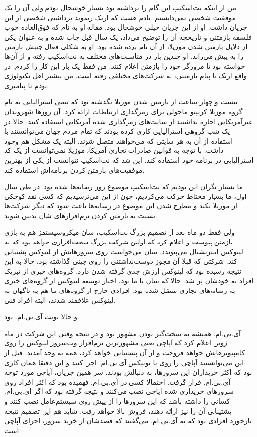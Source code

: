 من از اینکه نت‌اسکیپ این گام را برداشته بود بسیار خوشحال بودم ولی آن را
یک موفقیت شخصی نمی‌دانستم. یادم هست که اریک ریموند برداشتی
شخصی از این جریان داشت. او از این جریان خیلی خوشحال بود. مقاله او به
نام  که فوق‌العاده خوب فلسفه بازمتنی و
تاریخچه آن را توضیح می‌داد، یک سال قبل چاپ شده و به عنوان یکی از دلایل
بازمتن شدن موزیلا، از آن نام برده شده بود. او به شکلی فعال جنبش بازمتن
را به پیش می‌راند. او چندین بار در مناسبت‌های مختلف به نت‌اسکیپ رفته و از
آن‌ها خواسته بود تا مرورگر خود را بازمتن اعلام کنند. من فقط یک بار این
کار را کردم. در واقع اریک با پیام بازمتنی، به شرکت‌های مختلفی رفته
است. من بیشتر اهل تکنولوژی بودم تا پیامبری.

بیست و چهار ساعت از بازمتن شدن موزیلا نگذشته بود که تیمی استرالیایی به
نام گروه موزیلا کریپتو ماجولی برای
رمزگذاری ارتباطات ارائه کرد. آن روزها شهروندان غیرآمریکایی اجازه
نداشتند از سایت‌های رمزگذاری شده آمریکایی استفاده کنند. حالا در یک شب
گروهی استرالیایی کاری کرده بودند که تمام مردم جهان می‌توانستند با
استفاده از آن به هر سایتی که می‌خواهند متصل شوند. البته یک مشکل هم وجود
داشت. با توجه به قوانین صادرات تجاری آمریکا، موزیلا نمی‌توانست از یک کد
استرالیایی در برنامه خود استفاده کند. این شد که نت‌اسکیپ نتوانست از یکی
از بهترین موفقیت‌های بازمتن کردن برنامه‌اش استفاده کند.

ما بسیار نگران این بودیم که نت‌اسکیپ موضوع روز رسانه‌ها شده بود. در طی
سال اول، ما بسیار محتاط حرکت می‌کردیم، چون از این می‌ترسیدیم که کسی نقد
کوچکی از موزیلا بکند و مطرح شدن این موضوع در رسانه‌ها باعث شود که دیگر
شرکت‌ها نسبت به بازمتن کردن نرم‌افزارهای شان بدبین شوند.

ولی فقط دو ماه بعد از تصمیم بزرگ نت‌اسکیپ، سان میکروسیستمز هم به بازی
بازمتن پیوست و اعلام کرد که اولین شرکت بزرگ سخت‌افزاری خواهد بود که به
لینوکس اینترنشنال می‌پیوندد. سان می‌خواست روی سرورهایش از لینوکس پشتبانی
کند. شرکتی که قبلا آن مجوز دوست‌نداشتنی را روی جینی گذاشته بود، حالا به
این نتیجه رسیده بود که لینوکس ارزش جدی گرفته شدن دارد. گروه‌های خبری از
تبریک افراد به خودشان پر شد. حالا که سان با ما بود، اخبار توسعه لینوکس
از گروه‌های خبری به رسانه‌های تجاری منتقل شده بود. افرادی خارج از
گروه‌های ما هم به ناگهان به لینوکس علاقمند شدند، البته افراد فنی.

و حالا نوبت آی‌.بی.ام. بود. 

آی.بی.ام. همیشه به سخت‌گیر بودن مشهور بود و در نتیجه وقتی این شرکت در
ماه ژوئن اعلام کرد که آپاچی یعنی مشهورترین نرم‌افزار وب‌سرور لینوکس را
روی کامپیوترهایش خواهد فروخت و از آن پشتیبانی خواهد کرد، همه به وجد
آمدند. قبل از این می‌توانستید آپاچی را روی  یا یونیکس
آی.بی.ام. اجرا کنید و این دقیقا همان کاری بود که اکثر خریداران این
سرورها، به دنبالش بودند. سر همین جریان، آپاچی مورد توجه آی.بی.ام. قرار
گرفت. احتمالا کسی در آی.بی.ام. فهمیده بود که اکثر افراد روی سرورهای
خریداری شده آپاچی نصب می‌کنند و نتیجه گرفته بود که اگر آی.بی.ام. کسانی
را داشته باشد که این سرورها را از پیش روی سیستم‌عامل نصب کنند و
پشتیبانی آن را نیز ارائه دهند، فروش بالا خواهد رفت. شاید هم این تصمیم
نتیجه بازخورد افرادی بود که به آی.بی.ام. می‌گفتند که قصدشان از خرید
سرور، اجرای آپاچی است.

